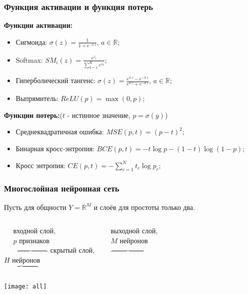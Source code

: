 \documentclass[unicode, notheorems]{beamer}
\begin{document}
\begin{frame}
	\frametitle{Функция активации и функция потерь}
	\textbf{Функции активации:}
	\begin{itemize}
		\item Сигмоида: $\sigma(z) = \frac{1}{1+e^{-a\,z}}$, $a \in \mathbb{R}$;

		\item Softmax: $SM_i(z)  = \frac{e^{z_i}}{\sum_{k=1}^{K}e^{z_k}}$;
		\item Гиперболический тангенс: $\sigma(z) = \frac{e^{a\,z} - e^{-a\,z}}{e^{a\,z} + e^{-a\,z}}$, $a \in \mathbb{R}$;
		\item Выпрямитель: $ReLU(p) = \max (0,p)$;
	\end{itemize}
	\textbf{Функции потерь:}($t$ - истинное значение, $p=\sigma(y)$)
		\begin{itemize}
		\item Среднеквадратичная ошибка: $MSE(p,t)=(p-t)^2$;	
		\item Бинарная кросс-энтропия: $BCE(p,t) = -t\log p - (1-t)\log (1-p)$;
		\item Кросс энтропия: $CE(p,t)=-\sum_{c=1}^{N}t_c \log p_c$;
	\end{itemize}
 
\end{frame}
\begin{frame}

	\frametitle{Многослойная нейронная сеть}
Пусть для общности $Y = \mathbb{R}^M$ и слоёв для простоты только два.\\
\vspace{0.4cm} 
\begin{columns}
	$\quad$ входной слой, \\
	$\quad$ $p$ признаков\\
	$\quad$ $\overbrace{\quad \quad \quad \quad \quad}$
	скрытый слой, \\
	$H$ нейронов\\
	$\overbrace{\quad \quad \quad \quad \quad}$
	
	$\,\,\,$ выходной слой, \\
	$\,\,\,$ $M$ нейронов\\
	$\,\,\,$  $\overbrace{\quad \quad \quad \quad \quad}$
	
\end{columns} 

\begin{center}
	\texttt{[image: all]}
\end{center} 	


\end{frame}
\end{document}
